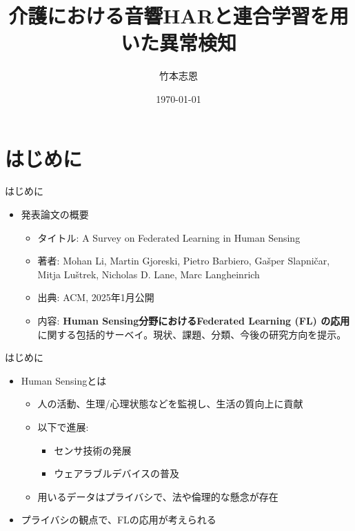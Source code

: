 \documentclass[unicode,12pt,aspectratio=169,dvipdfmx]{beamer}
\title{介護における音響HARと連合学習を用いた異常検知}
\author{竹本志恩}
\institute{INIAD}
\date{\today}
\begin{document}
\begin{frame}
    \titlepage
\end{frame}

\section{はじめに}
\begin{frame}{はじめに}
    \begin{itemize}
        \item 発表論文の概要
        \begin{itemize}
            \item タイトル: A Survey on Federated Learning in Human Sensing
            \item 著者: Mohan Li, Martin Gjoreski, Pietro Barbiero, Gašper Slapničar, Mitja Luštrek, Nicholas D. Lane, Marc Langheinrich
            \item 出典: ACM, 2025年1月公開
            \item 内容: \textbf{Human Sensing分野におけるFederated Learning (FL) の応用}に関する包括的サーベイ。現状、課題、分類、今後の研究方向を提示。
        \end{itemize}
    \end{itemize}
\end{frame}


\begin{frame}{はじめに}
    \begin{itemize}
        \item Human Sensingとは
        \begin{itemize}
            \item 人の活動、生理/心理状態などを監視し、生活の質向上に貢献
            \item 以下で進展:
            \begin{itemize}
                \item センサ技術の発展
                \item ウェアラブルデバイスの普及
            \end{itemize}
            \item 用いるデータはプライバシで、法や倫理的な懸念が存在
        \end{itemize}
        \item プライバシの観点で、FLの応用が考えられる
    \end{itemize}
\end{frame}
\end{document}
